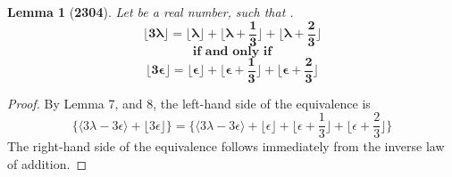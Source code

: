 \documentclass[preview]{standalone}
\newtheorem{lemma}{Lemma}
\begin{document}
\begin{lemma}[\textbf{2304}]
    Let \bm{$\lambda$} be a real number, 
    such that \bm{$\big \lfloor \lambda \big \rfloor + \epsilon = \lambda$}.
    \begin{equation*}
        \bm{
            \bigg \lfloor 3 \lambda \bigg \rfloor
                =
            \bigg \lfloor \lambda \bigg \rfloor 
                + 
            \bigg \lfloor \lambda + \frac{1}{3} \bigg \rfloor 
                + 
            \bigg \lfloor \lambda + \frac{2}{3} \bigg \rfloor
        }
    \end{equation*}
    \begin{equation*}
        \textbf{if and only if}
    \end{equation*}
    \begin{equation*}
        \bm{
            \bigg \lfloor 3 \epsilon \bigg \rfloor
                =
            \bigg \lfloor \epsilon \bigg \rfloor 
                + 
            \bigg \lfloor \epsilon + \frac{1}{3} \bigg \rfloor 
                + 
            \bigg \lfloor \epsilon + \frac{2}{3} \bigg \rfloor
        }
    \end{equation*}
\end{lemma}

\begin{proof}
    By Lemma 7, and 8, the left-hand side of the equivalence is
    \begin{equation*}
        \Bigg\{
            \bigg \langle 
                3 \lambda - 3 \epsilon 
            \bigg \rangle
                +
            \bigg \lfloor 3 \epsilon \bigg \rfloor
        \Bigg\}
            =
        \Bigg\{
            \bigg \langle 3 \lambda - 3 \epsilon \bigg \rangle
                + 
            \bigg \lfloor \epsilon \bigg \rfloor 
                + 
            \bigg \lfloor \epsilon + \frac{1}{3} \bigg \rfloor 
                + 
            \bigg \lfloor \epsilon + \frac{2}{3} \bigg \rfloor
        \Bigg\}
    \end{equation*}
    The right-hand side of the equivalence follows immediately 
    from the inverse law of addition.
\end{proof}
\end{document}
